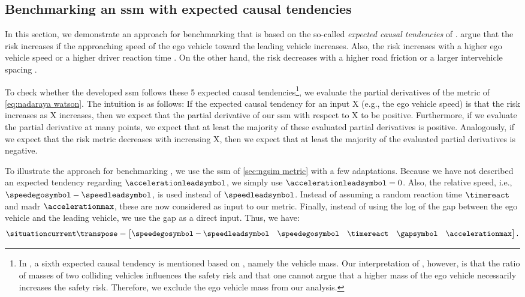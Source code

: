 \subsection{Benchmarking an \acs{ssm} with expected causal tendencies}
\label{sec:tendencies}

In this section, we demonstrate an approach for benchmarking  that is based on the so-called \emph{expected causal tendencies} of \textcite{mullakkal2017comparative}.
\textcite{mullakkal2017comparative} argue that the risk increases if the approaching speed of the ego vehicle toward the leading vehicle increases.
Also, the risk increases with a higher ego vehicle speed \autocite{aarts2006driving} or a higher driver reaction time \autocite{klauer2006impact}.
On the other hand, the risk decreases with a higher road friction \autocite{wallman2001friction} or a larger intervehicle spacing \autocite{mullakkal2017comparative}.

To check whether the developed \ac{ssm} follows these 5 expected causal tendencies\footnote{In \autocite{mullakkal2017comparative}, a sixth expected causal tendency is mentioned based on \autocite{evans1994driver}, namely the vehicle mass. 
Our interpretation of \autocite{evans1994driver}, however, is that the ratio of masses of two colliding vehicles influences the safety risk and that one cannot argue that a higher mass of the ego vehicle necessarily increases the safety risk. 
Therefore, we exclude the ego vehicle mass from our analysis.}, we evaluate the partial derivatives of the metric of \cref{eq:nadaraya watson}.
The intuition is as follows: If the expected causal tendency for an input X (e.g., the ego vehicle speed) is that the risk increases as X increases, then we expect that the partial derivative of our \ac{ssm} with respect to X to be positive.
Furthermore, if we evaluate the partial derivative at many points, we expect that at least the majority of these evaluated partial derivatives is positive.
Analogously, if we expect that the risk metric decreases with increasing X, then we expect that at least the majority of the evaluated partial derivatives is negative.

To illustrate the approach for benchmarking , we use the \ac{ssm} of \cref{sec:ngsim metric} with a few adaptations.
Because we have not described an expected tendency regarding $\accelerationleadsymbol$, we simply use $\accelerationleadsymbol=0$.
Also, the relative speed, i.e., $\speedegosymbol-\speedleadsymbol$, is used instead of $\speedleadsymbol$.
Instead of assuming a random reaction time $\timereact$ and \ac{madr} $\accelerationmax$, these are now considered as input to our metric. 
Finally, instead of using the log of the gap between the ego vehicle and the leading vehicle, we use the gap as a direct input.
Thus, we have:
\begin{equation}
	\label{eq:input partial derivatives}
	\situationcurrent\transpose = \begin{bmatrix}
		\speedegosymbol-\speedleadsymbol & \speedegosymbol & \timereact & \gapsymbol & \accelerationmax
	\end{bmatrix}.
\end{equation}

